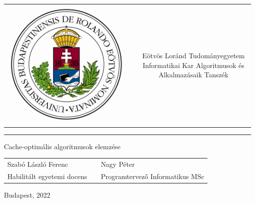 \documentclass[12pt]{report}
\begin{document}
\begin{titlepage}
\vspace*{0cm}
\centering
\begin{tabular}{cp{2cm}c}
\begin{minipage}{4cm}
\vspace{0pt}
\includegraphics[width=1\textwidth]{eltecimerszines}
\end{minipage} & &
\begin{minipage}{7cm}
\vspace{0pt}Eötvös Loránd Tudományegyetem \vspace{10pt} \newline
Informatikai Kar \vspace{10pt} \newline
Algoritmusok és Alkalmazásaik Tanszék
\end{minipage}
\end{tabular}

\vspace*{0.2cm}
\rule{\textwidth}{1pt}

\vspace*{6cm}
{\Huge Cache-optimális algoritmusok elemzése}

\vspace*{5cm}
\begin{tabular}{lp{3cm}l}
Szabó László Ferenc & & Nagy Péter\\
Habilitált egyetemi docens & & Programtervező Informatikus MSc
\end{tabular}

\vfill

\vspace*{1cm}
Budapest, 2022
\end{titlepage}
\end{document}
